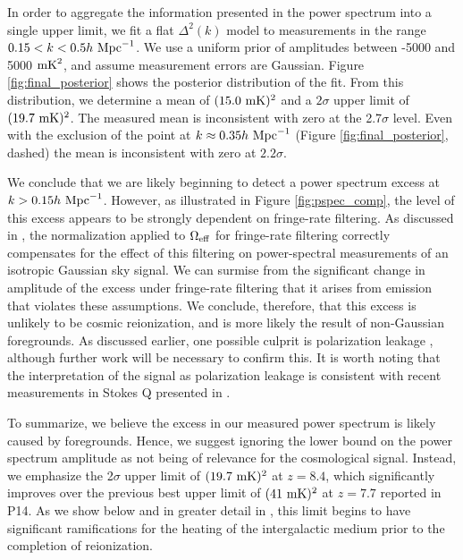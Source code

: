 \documentclass[twocolumn,numberedappendix]{emulateapj} \shorttitle{PSA64}
\newcommand{\hMpci}{h\ {\rm Mpc}^{-1}}
\begin{document}
In order to aggregate the information presented in the power spectrum into
a single upper limit, we fit a flat $\Delta^2(k)$ model to measurements
in the range $0.15<k<0.5\hMpci$.  We use a uniform prior of amplitudes between
-5000 and 5000 ${\rm mK}^2$, and assume measurement errors are Gaussian.
Figure \ref{fig:final_posterior} shows the posterior distribution of the fit.
From this distribution, we determine a mean of
$(15.0~{\rm mK})^2$ and a $2\sigma$ upper limit of $(19.7~{\rm mK})^2$. 
The measured mean is inconsistent with zero at the 2.7$\sigma$ level.
Even with the exclusion of the point at $k\approx0.35\hMpci$
(Figure \ref{fig:final_posterior}, dashed) the mean is inconsistent with
zero at $2.2\sigma$.

We conclude that we are likely beginning to 
detect a power spectrum excess at $k>0.15\hMpci$.  However, as illustrated
in Figure \ref{fig:pspec_comp}, the level of this excess appears to be
strongly dependent on fringe-rate filtering.  As discussed in \citet{parsons_et_al2015},
the normalization applied to $\Omega_{\rm eff}$ for fringe-rate filtering correctly
compensates for the effect of this filtering on power-spectral measurements
of an isotropic Gaussian sky signal.  We can surmise from the significant change in amplitude of the excess
under fringe-rate filtering that it arises from emission that violates these assumptions.
We conclude, therefore, that this excess is unlikely to be cosmic reionization, and is more
likely the result of non-Gaussian foregrounds.  As discussed earlier, one possible
culprit is polarization leakage \citep{moore_et_al2014,jelic_et_al2010,jelic_et_al2014}, although further
work will be necessary to confirm this.  It is worth noting that the interpretation of
the signal as polarization leakage is consistent with recent measurements in Stokes Q presented
in \citet{moore_et_al2015}.


To summarize, we believe the excess in our measured power spectrum is likely caused
by foregrounds.  Hence, we suggest ignoring the lower bound on the power spectrum amplitude
as not being of relevance for the cosmological signal.  Instead, we emphasize the 
2$\sigma$ upper limit of $(19.7~{\rm mK})^2$ at $z=8.4$, which significantly improves over the previous
best upper limit of $(41~{\rm mK})^2$ at $z=7.7$ reported in P14.  As we show below and in
greater detail in \citet{pober_et_al2015}, this limit begins to have significant ramifications
for the heating of the intergalactic medium prior to the completion of reionization.
\end{document}
